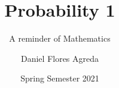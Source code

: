 \documentclass[notes=show,handout]{beamer}
\newtheorem{statement}{Statement}[section]
\begin{document}
\title[S110015]{Probability 1}
\subtitle{A reminder of Mathematics}
\author[Flores Agreda]{Daniel {Flores Agreda}}
\date{Spring Semester 2021}
\maketitle



%
%
%
%
%
%
%
%
%
%
%



%
%
%
%
%
%
%
%
%
\end{document}
